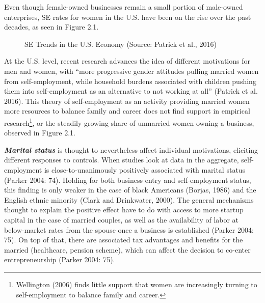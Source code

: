 Even though female-owned businesses remain a small portion of male-owned enterprises, SE rates for women in the U.S. have been on the rise over the past decades, as seen in Figure 2.1. 

\begin{figure}[hbtp]
        \caption{SE Trends in the U.S. Economy (Source: Patrick et al., 2016)}  
\end{figure}

At the U.S. level, recent research advances the idea of different motivations for men and women, with “more progressive gender attitudes pulling married women from self-employment, while household burdens associated with children pushing them into self-employment as an alternative to not working at all” (Patrick et al. 2016). This theory of self-employment as an activity providing married women more resources to balance family and career does not find support in empirical research\footnote{Wellington (2006) finds little support that women are increasingly turning to self-employment to balance family and career.}, or the steadily growing share of unmarried women owning a business, observed in Figure 2.1.

\textbf{\textit{Marital status}} is thought to nevertheless affect individual motivations, eliciting different responses to controls. When studies look at data in the aggregate, self-employment is close-to-unanimously positively associated with marital status (Parker 2004: 74). Holding for both business entry and self-employment status, this finding is only weaker in the case of black Americans (Borjas, 1986) and the English ethnic minority (Clark and Drinkwater, 2000). The general mechanisms thought to explain the positive effect have to do with access to more startup capital in the case of married couples, as well as the availability of labor at below-market rates from the spouse once a business is established (Parker 2004: 75). On top of that, there are associated tax advantages and benefits for the married (healthcare, pension scheme), which can affect the decision to co-enter entrepreneurship (Parker 2004: 75).

